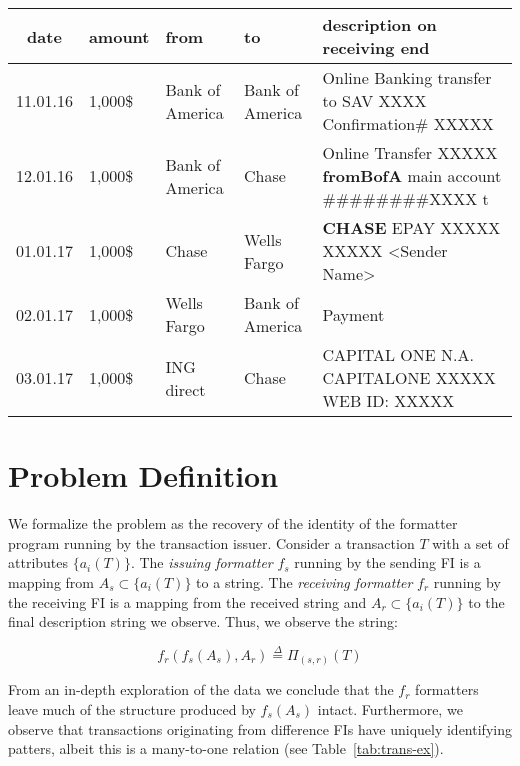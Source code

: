 \documentclass[sigconf]{acmart}
\begin{document}
\begin{table*}
  \caption{Examples of the money transfer transactions and their description by the receiving entities. A small percent of transactions include the sender financial institute explicitly (oversampled here and shown in bold), the rest we attempt to infer from the structure of the string. Numbers and other identifying or private information is censored using Xs. }
  \label{tab:trans-ex}
  \begin{tabular}{cllll}
    \toprule
    date & amount & from  & to & description on receiving end \\
    \midrule
    11.01.16 & 1,000\$    & Bank of America & Bank of America & Online Banking transfer to SAV XXXX Confirmation\# XXXXX \\
    12.01.16 & 1,000\$ & Bank of America & Chase & Online Transfer XXXXX \textbf{fromBofA} main account \#\#\#\#\#\#\#\#XXXX t \\
    01.01.17 & 1,000\$ & Chase & Wells Fargo & \textbf{CHASE} EPAY XXXXX XXXXX <Sender Name> \\
    02.01.17 & 1,000\$ & Wells Fargo & Bank of America & Payment \\
    03.01.17 & 1,000\$ & ING direct & Chase & CAPITAL ONE N.A. CAPITALONE XXXXX WEB ID: XXXXX \\
    \bottomrule
\end{tabular}
\end{table*}

\section{Problem Definition}
\label{sec:problem}
We formalize the problem as the recovery of the identity of the formatter program running by the transaction issuer. Consider a transaction $T$ with a set of attributes $\{a_i(T)\}$. The \textit{issuing formatter} $f_{s}$ running by the sending FI is a mapping from  $A_s \subset \{a_i(T)\}$ to a string. The \textit{receiving formatter} $f_{r}$ running by the receiving FI is a mapping from the received string and $A_r \subset \{a_i(T)\}$ to the final description string we observe. Thus, we observe the string:

\[ f_r(f_s(A_s),A_r) \overset{\Delta}{=} \Pi_{(s,r)} (T) \]

From an in-depth exploration of the data we conclude that the $f_r$ formatters leave much of the structure produced by $f_s(A_s)$ intact. Furthermore, we observe that transactions originating from difference FIs have uniquely identifying patters, albeit this is a many-to-one relation (see Table~\ref{tab:trans-ex}). 
\end{document}
